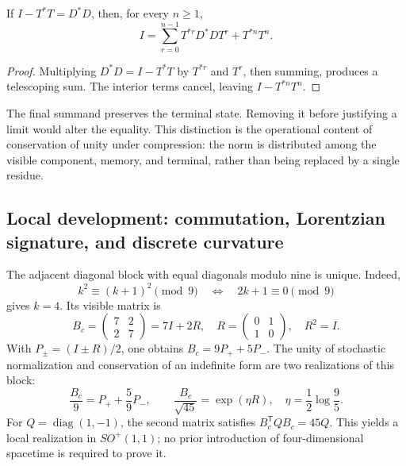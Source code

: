 \begin{proposition}
If \(I-T^*T=D^*D\), then, for every \(n\ge1\),
\begin{equation}
 I=\sum_{r=0}^{n-1}T^{*r}D^*DT^r+T^{*n}T^n.
 \label{eq:telescopia}
\end{equation}
\end{proposition}
\begin{proof}
Multiplying \(D^*D=I-T^*T\) by \(T^{*r}\) and \(T^r\), then summing, produces a telescoping sum. The interior terms cancel, leaving \(I-T^{*n}T^n\).
\end{proof}

The final summand preserves the terminal state. Removing it before justifying a limit would alter the equality. This distinction is the operational content of conservation of unity under compression: the norm is distributed among the visible component, memory, and terminal, rather than being replaced by a single residue.

\subsection{Local development: commutation, Lorentzian signature, and discrete curvature}
\label{vii:sec:bloque-compresion}

The adjacent diagonal block with equal diagonals modulo nine is unique. Indeed,
\[
 k^2\equiv(k+1)^2\pmod9\quad\Longleftrightarrow\quad2k+1\equiv0\pmod9
\]
gives \(k=4\). Its visible matrix is
\[
 B_c=\begin{pmatrix}7&2\\2&7\end{pmatrix}=7I+2R,
 \quad R=\begin{pmatrix}0&1\\1&0\end{pmatrix},\quad R^2=I.
\]
With \(P_\pm=(I\pm R)/2\), one obtains \(B_c=9P_++5P_-\). The unity of stochastic normalization and conservation of an indefinite form are two realizations of this block:
\[
 \frac{B_c}{9}=P_++\frac59P_-,\qquad
 \frac{B_c}{\sqrt{45}}=\exp(\eta R),\quad\eta=\frac12\log\frac95.
\]
For \(Q=\operatorname{diag}(1,-1)\), the second matrix satisfies \(B_c^{\mathsf T}QB_c=45Q\). This yields a local realization in \(SO^+(1,1)\); no prior introduction of four-dimensional spacetime is required to prove it.

